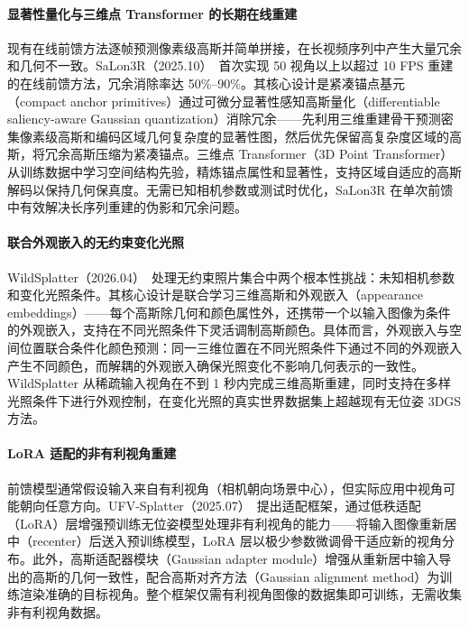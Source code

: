 \paragraph{显著性量化与三维点 Transformer 的长期在线重建}

现有在线前馈方法逐帧预测像素级高斯并简单拼接，在长视频序列中产生大量冗余和几何不一致。SaLon3R（2025.10）~\cite{2510_15072}首次实现 50 视角以上以超过 10 FPS 重建的在线前馈方法，冗余消除率达 50\%--90\%。其核心设计是紧凑锚点基元（compact anchor primitives）通过可微分显著性感知高斯量化（differentiable saliency-aware Gaussian quantization）消除冗余——先利用三维重建骨干预测密集像素级高斯和编码区域几何复杂度的显著性图，然后优先保留高复杂度区域的高斯，将冗余高斯压缩为紧凑锚点。三维点 Transformer（3D Point Transformer）从训练数据中学习空间结构先验，精炼锚点属性和显著性，支持区域自适应的高斯解码以保持几何保真度。无需已知相机参数或测试时优化，SaLon3R 在单次前馈中有效解决长序列重建的伪影和冗余问题。

\paragraph{联合外观嵌入的无约束变化光照}

WildSplatter（2026.04）~\cite{2604_21182}处理无约束照片集合中两个根本性挑战：未知相机参数和变化光照条件。其核心设计是联合学习三维高斯和外观嵌入（appearance embeddings）——每个高斯除几何和颜色属性外，还携带一个以输入图像为条件的外观嵌入，支持在不同光照条件下灵活调制高斯颜色。具体而言，外观嵌入与空间位置联合条件化颜色预测：同一三维位置在不同光照条件下通过不同的外观嵌入产生不同颜色，而解耦的外观嵌入确保光照变化不影响几何表示的一致性。WildSplatter 从稀疏输入视角在不到 1 秒内完成三维高斯重建，同时支持在多样光照条件下进行外观控制，在变化光照的真实世界数据集上超越现有无位姿 3DGS 方法。

\paragraph{LoRA 适配的非有利视角重建}

前馈模型通常假设输入来自有利视角（相机朝向场景中心），但实际应用中视角可能朝向任意方向。UFV-Splatter（2025.07）~\cite{2507_22342}提出适配框架，通过低秩适配（LoRA）层增强预训练无位姿模型处理非有利视角的能力——将输入图像重新居中（recenter）后送入预训练模型，LoRA 层以极少参数微调骨干适应新的视角分布。此外，高斯适配器模块（Gaussian adapter module）增强从重新居中输入导出的高斯的几何一致性，配合高斯对齐方法（Gaussian alignment method）为训练渲染准确的目标视角。整个框架仅需有利视角图像的数据集即可训练，无需收集非有利视角数据。

